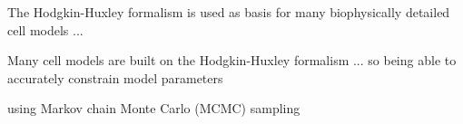 The Hodgkin-Huxley formalism is used as basis for many biophysically detailed cell models ...

Many cell models are built on the Hodgkin-Huxley formalism ... so being able to accurately constrain model parameters

using Markov chain Monte Carlo (MCMC) sampling






